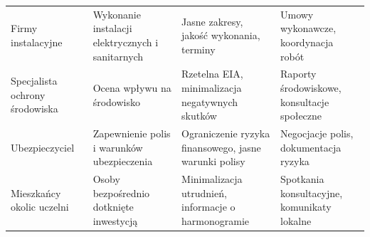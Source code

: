 \documentclass[a4paper,12pt]{article}
\begin{document}
\begin{center}
\begin{tabularx}{\textwidth}{X X X X}
\addlinespace
Firmy instalacyjne & Wykonanie instalacji elektrycznych i sanitarnych & Jasne zakresy, jakość wykonania, terminy & Umowy wykonawcze, koordynacja robót \\
\addlinespace
Specjalista ochrony środowiska & Ocena wpływu na środowisko & Rzetelna EIA, minimalizacja negatywnych skutków & Raporty środowiskowe, konsultacje społeczne \\
\addlinespace
Ubezpieczyciel & Zapewnienie polis i warunków ubezpieczenia & Ograniczenie ryzyka finansowego, jasne warunki polisy & Negocjacje polis, dokumentacja ryzyka \\
\addlinespace
Mieszkańcy okolic uczelni & Osoby bezpośrednio dotknięte inwestycją & Minimalizacja utrudnień, informacje o harmonogramie & Spotkania konsultacyjne, komunikaty lokalne \\
\bottomrule
\end{tabularx}
\end{center}
\end{document}
